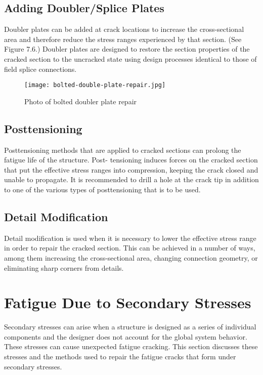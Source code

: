 \subsection{Adding Doubler/Splice Plates}

Doubler plates can be added at crack locations to increase the cross-sectional area and therefore reduce the stress
ranges experienced by that section. (See Figure 7.6.) Doubler plates are designed to restore the section properties of
the cracked section to the uncracked state using design processes identical to those of field splice connections.

\begin{figure}
  \texttt{[image: bolted-double-plate-repair.jpg]}
  \caption{Photo of bolted doubler plate repair}
  \label{fig:bolted-double-plate-repair}
\end{figure}

\subsection{Posttensioning}
Posttensioning methods that are applied to cracked sections can prolong the fatigue life of the structure. Post-
tensioning induces forces on the cracked section that put the effective stress ranges into compression, keeping the
crack closed and unable to propagate. It is recommended to drill a hole at the crack tip in addition to one of the
various types of posttensioning that is to be used.


\subsection{Detail Modification}
Detail modification is used when it is necessary to lower the effective stress range in order to repair the cracked
section. This can be achieved in a number of ways, among them increasing the cross-sectional area, changing
connection geometry, or eliminating sharp corners from details.

\section{Fatigue Due to Secondary Stresses}

Secondary stresses can arise when a structure is designed as a series of individual components and the designer
does not account for the global system behavior. These stresses can cause unexpected fatigue cracking. This section
discusses these stresses and the methods used to repair the fatigue cracks that form under secondary stresses.



